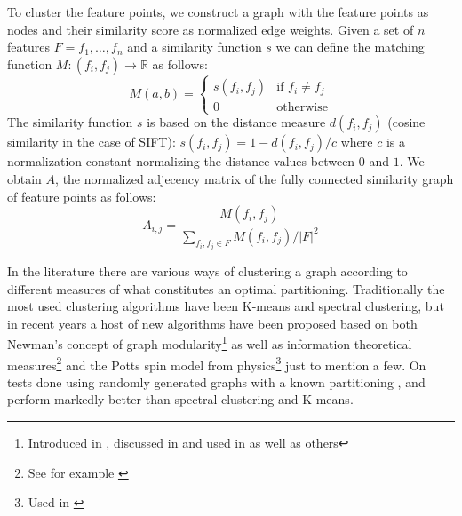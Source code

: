 To cluster the feature points, we construct a graph with the feature 
points as nodes and their similarity score as normalized edge weights.  
Given a set of $n$ features $F = {f_1, \ldots, f_n}$ and a similarity 
function $s$ we can define the matching function $M : (f_i, f_j) 
\rightarrow \mathbb{R}$ as follows:
\begin{equation*}
    M(a,b) = \begin{cases} s(f_i, f_j) & \mbox{if } f_i \neq f_j \\ 0 & 
    \mbox{otherwise}
	\end{cases}
\end{equation*}
The similarity function $s$ is based on the distance measure 
$d(f_i,f_j)$ (cosine similarity in the case of SIFT): $s(f_i, f_j) = 1 - 
d(f_i,f_j) / c$ where $c$ is a normalization constant normalizing the 
distance values between $0$ and $1$.
We obtain $A$, the normalized adjecency matrix of the fully connected 
similarity graph of feature points as follows:
\begin{equation*}
    A_{i,j} = \frac{M(f_i, f_j)}{\sum\limits_{f_i,f_j \in F} M(f_i, f_j) 
    / \left\vert F \right\vert ^ {2}}
\end{equation*}

In the literature there are various ways of clustering a graph according 
to different measures of what constitutes an optimal partitioning. 
Traditionally the most used clustering algorithms have been K-means and 
spectral clustering, but in recent years a host of new algorithms have 
been proposed based on both Newman's concept of graph 
modularity\footnote{Introduced in \cite{girvan2002}, discussed in 
\cite{brandes2007} and used in \cite{blondel2008} as well as others} as 
well as information theoretical measures\footnote{See for example 
\cite{rosvall2008}} and the Potts spin model from physics\footnote{Used 
in \cite{ronhovde2009}} just to mention a few. On tests done using 
randomly generated graphs with a known partitioning \cite{blondel2008}, 
\cite{rosvall2008} and \cite{ronhovde2009} perform markedly better than 
spectral clustering and K-means\cite{lancichinetti2009}.


